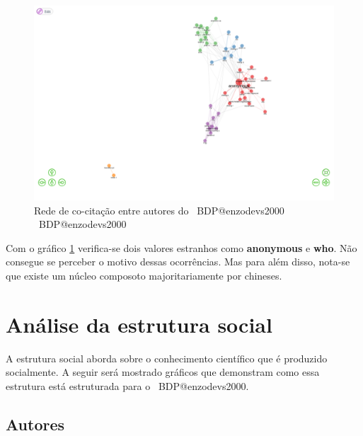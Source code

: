  \begin{figure}[H]
    \centering
    \includegraphics[width=1\textwidth]{experiments/enzodevs2000/AnaliseBibliometrica/BigDataInPolicy/Figures/Graficos/NovoDataset/Intelectual/intelectual_network.png}
    \caption{Rede de co-citação entre autores do \dataset\ BDP@enzodevs2000
    \dataset\ BDP@enzodevs2000}
    \label{fig:enzodevs2000:BDP:newdataset:intelectual:network}
\end{figure}
 
Com o gráfico \ref{fig:enzodevs2000:BDP:newdataset:intelectual:network} verifica-se dois valores estranhos como \textbf{anonymous} e \textbf{who}. Não consegue se perceber o motivo dessas ocorrências. Mas para além disso, nota-se que existe um núcleo composoto majoritariamente por chineses.

\section{Análise da estrutura social}
A estrutura social aborda sobre o conhecimento científico que é produzido socialmente. A seguir será mostrado gráficos que demonstram como essa estrutura está estruturada para o \dataset\ BDP@enzodevs2000.

\subsection{Autores}

